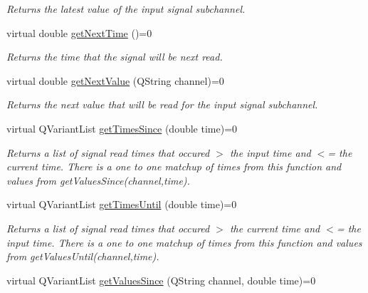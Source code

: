 \begin{DoxyCompactItemize}
\begin{DoxyCompactList}\small\item\em Returns the latest value of the input signal subchannel. \end{DoxyCompactList}\item 
\hypertarget{class_picto_1_1_signal_reader_ac18b0a14e2582bf1cd23b2315ed8cbee}{virtual double \hyperlink{class_picto_1_1_signal_reader_ac18b0a14e2582bf1cd23b2315ed8cbee}{get\-Next\-Time} ()=0}\label{class_picto_1_1_signal_reader_ac18b0a14e2582bf1cd23b2315ed8cbee}

\begin{DoxyCompactList}\small\item\em Returns the time that the signal will be next read. \end{DoxyCompactList}\item 
\hypertarget{class_picto_1_1_signal_reader_a3b3636faff8d38f4f625944dc984202a}{virtual double \hyperlink{class_picto_1_1_signal_reader_a3b3636faff8d38f4f625944dc984202a}{get\-Next\-Value} (Q\-String channel)=0}\label{class_picto_1_1_signal_reader_a3b3636faff8d38f4f625944dc984202a}

\begin{DoxyCompactList}\small\item\em Returns the next value that will be read for the input signal subchannel. \end{DoxyCompactList}\item 
\hypertarget{class_picto_1_1_signal_reader_a54e82ed076d3607b44b9dab06d991e5c}{virtual Q\-Variant\-List \hyperlink{class_picto_1_1_signal_reader_a54e82ed076d3607b44b9dab06d991e5c}{get\-Times\-Since} (double time)=0}\label{class_picto_1_1_signal_reader_a54e82ed076d3607b44b9dab06d991e5c}

\begin{DoxyCompactList}\small\item\em Returns a list of signal read times that occured $>$ the input time and $<$= the current time. There is a one to one matchup of times from this function and values from get\-Values\-Since(channel,time). \end{DoxyCompactList}\item 
\hypertarget{class_picto_1_1_signal_reader_af0ae37d53d4e8a7a8685fffa249be000}{virtual Q\-Variant\-List \hyperlink{class_picto_1_1_signal_reader_af0ae37d53d4e8a7a8685fffa249be000}{get\-Times\-Until} (double time)=0}\label{class_picto_1_1_signal_reader_af0ae37d53d4e8a7a8685fffa249be000}

\begin{DoxyCompactList}\small\item\em Returns a list of signal read times that occured $>$ the current time and $<$= the input time. There is a one to one matchup of times from this function and values from get\-Values\-Until(channel,time). \end{DoxyCompactList}\item 
\hypertarget{class_picto_1_1_signal_reader_a1923ba6e722db76b92fa4d48ddcfe3bb}{virtual Q\-Variant\-List \hyperlink{class_picto_1_1_signal_reader_a1923ba6e722db76b92fa4d48ddcfe3bb}{get\-Values\-Since} (Q\-String channel, double time)=0}\label{class_picto_1_1_signal_reader_a1923ba6e722db76b92fa4d48ddcfe3bb}


\end{DoxyCompactItemize}
